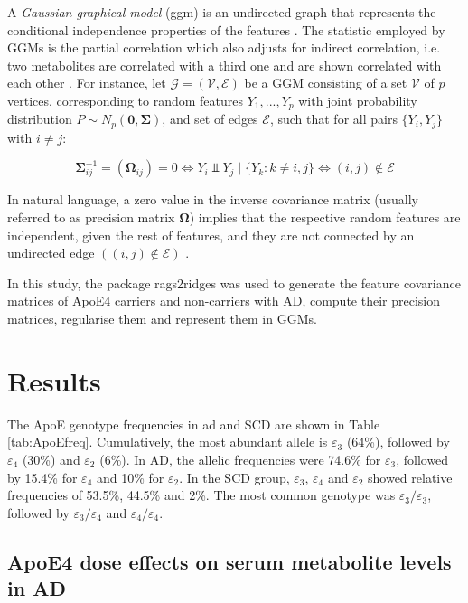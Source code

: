 \documentclass{amsart}
\begin{document}
A \textit{Gaussian graphical model} (\acrshort{ggm}) is an undirected graph that represents the conditional independence properties of the features \cite{KollerProbabilisticTechniques}. The statistic employed by GGMs is the partial correlation which also adjusts for indirect correlation, i.e. two metabolites are correlated with a third one and are shown correlated with each other \cite{Amara2022NetworksInterpretation}. For instance, let $\mathcal{G=(V,E)}$ be a GGM consisting of a set $\mathcal{V}$ of $p$ vertices, corresponding to random features $Y_1,...,Y_p$ with joint probability distribution $P \sim N_p(\mathbf{0, \Sigma})$, and set of edges $\mathcal{E}$, such that for all pairs $\{Y_i , Y_j\}$ with $i\neq j$:

\[ \mathbf{\Sigma}_{ij}^{-1} = (\mathbf{\Omega}_{ij})=0 \Longleftrightarrow Y_i \Perp Y_j\mid\{Y_k : k \neq i,j\} \Longleftrightarrow (i, j) \notin \mathcal{E} \]

In natural language, a zero value in the inverse covariance matrix (usually referred to as precision matrix $\mathbf{\Omega}$) implies that the respective random features are independent, given the rest of features, and they are not connected by an undirected edge $((i, j) \notin \mathcal{E})$ \cite{Peeters2022Rags2ridges:Matrices}.

In this study, the package \textsf{rags2ridges} \cite{Peeters2022Rags2ridges:Matrices} was used to generate the feature covariance matrices of ApoE4 carriers and non-carriers with AD, compute their precision matrices, regularise them and represent them in GGMs.

\clearpage
\section{Results} \label{results}
The ApoE genotype frequencies in \acrshort{ad} and SCD are shown in Table \ref{tab:ApoEfreq}. Cumulatively, the most abundant allele is $\varepsilon_3$ (64\%), followed by $\varepsilon_4$ (30\%) and $\varepsilon_2$ (6\%). In AD, the allelic frequencies were 74.6\% for $\varepsilon_3$, followed by 15.4\% for $\varepsilon_4$ and 10\% for $\varepsilon_2$. In the SCD group, $\varepsilon_3$, $\varepsilon_4$ and $\varepsilon_2$ showed relative frequencies of 53.5\%, 44.5\% and 2\%. The most common genotype was $\varepsilon_3/\varepsilon_3$, followed by $\varepsilon_3/\varepsilon_4$ and $\varepsilon_4/\varepsilon_4$.
\subsection{ApoE4 dose effects on serum metabolite levels in AD}
\end{document}
